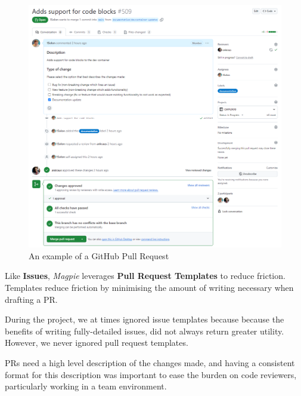 \begin{figure}[htbp]
    \centering{}
    \includegraphics[width=\textwidth]{images/github_pr.png}
    \caption{An example of a GitHub Pull Request}
\end{figure}

\newpage{}

Like \textbf{Issues}, \textit{Magpie} leverages \textbf{Pull Request Templates}
to reduce friction. Templates reduce friction by minimising the amount of
writing necessary when drafting a PR.

During the project, we at times ignored issue templates because because the
benefits of writing fully-detailed issues, did not always return greater
utility. However, we never ignored pull request templates.

PRs need a high level description of the changes made, and having a consistent
format for this description was important to ease the burden on code reviewers,
particularly working in a team environment.

